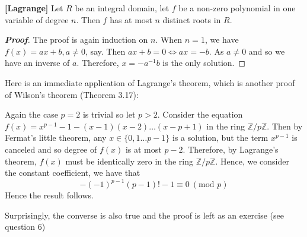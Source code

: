\begin{corollary}{\bf [Lagrange]}\label{L;Lagrange} Let $R$ be an integral domain, let $f$ be a non-zero polynomial in one variable of degree $n$. Then $f$ has at most $n$ distinct roots in $R$.
\end{corollary}
\begin{proof}[\bf Proof] The proof is again induction on $n$. When $n=1$, we have $f(x)=ax+b, a \neq 0$, say. Then $ax+b=0 \iff ax=-b$. As $a \neq 0$ and so we have an inverse of $a$. Therefore, $x=-a^{-1}b$ is the only solution.
\end{proof}
Here is an immediate application of Lagrange's theorem, which is another proof of Wilson's theorem (Theorem 3.17):

Again the case $p=2$ is trivial so let $p>2$. Consider the equation $f(x)=x^{p-1}-1 -(x-1)(x-2) \ldots(x-p+1)$ in the ring $\mathbb{Z}/p\mathbb{Z}$. Then by Fermat's little theorem, any $x \in \{0,1 \ldots p-1\}$ is a solution, but the term $x^{p-1}$ is canceled and so degree of $f(x)$ is at most $p-2$. Therefore, by Lagrange's theorem, $f(x)$ must be identically zero in the ring $\mathbb{Z}/p\mathbb{Z}$. Hence, we consider the constant coefficient, we have that
\begin{equation*} -(-1)^{p-1} (p-1)! -1 \equiv 0~(\text{mod } p) \end{equation*}
Hence the result follows.

Surprisingly, the converse is also true and the proof is left as an exercise (see question 6)
